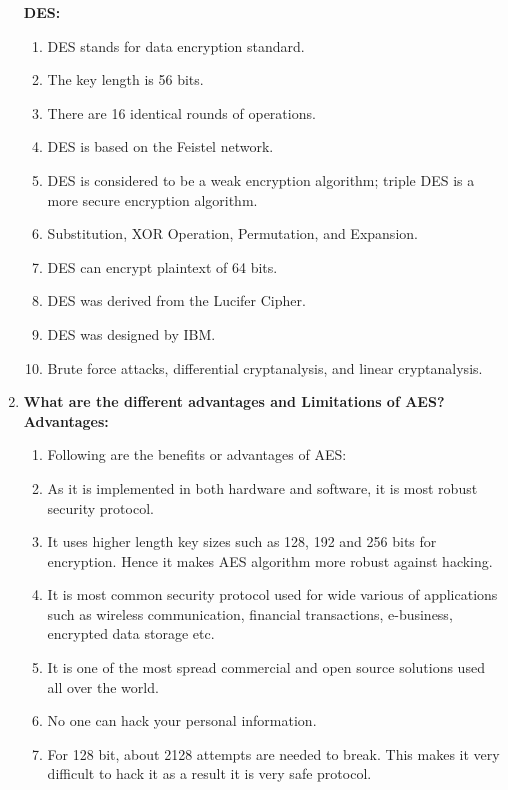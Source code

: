 \documentclass[11pt]{article}
\begin{document}
\begin{enumerate}
	\textbf{DES: }
	\begin{enumerate}
		\item DES stands for data encryption standard.                                                               
		\item The key length is 56 bits.                                                                             
		\item There are 16 identical rounds of operations.                                                           
		\item DES is based on the Feistel network.                                                                   
		\item DES is considered to be a weak encryption algorithm; triple DES is a more secure encryption algorithm. 
		\item Substitution, XOR Operation, Permutation, and Expansion.                                               
		\item DES can encrypt plaintext of 64 bits.                                                                  
		\item DES was derived from the Lucifer Cipher.                                                               
		\item DES was designed by IBM.                                                                               
		\item Brute force attacks, differential cryptanalysis, and linear cryptanalysis.                             
	\end{enumerate}
	
	\item \textbf{What are the different advantages and Limitations of AES?}\\
	      \textbf{Advantages: }\\
	      \begin{enumerate}
		      \item Following are the benefits or advantages of AES:
		      \item As it is implemented in both hardware and software, it is most robust security protocol.
		      \item It uses higher length key sizes such as 128, 192 and 256 bits for encryption. Hence it makes AES algorithm more robust against hacking.
		      \item It is most common security protocol used for wide various of applications such as wireless communication, financial transactions, e-business, encrypted data storage etc.
		      \item It is one of the most spread commercial and open source solutions used all over the world.
		      \item No one can hack your personal information.
		      \item For 128 bit, about 2128 attempts are needed to break. This makes it very difficult to hack it as a result it is very safe protocol.
	      \end{enumerate}



\end{enumerate}
\end{document}
